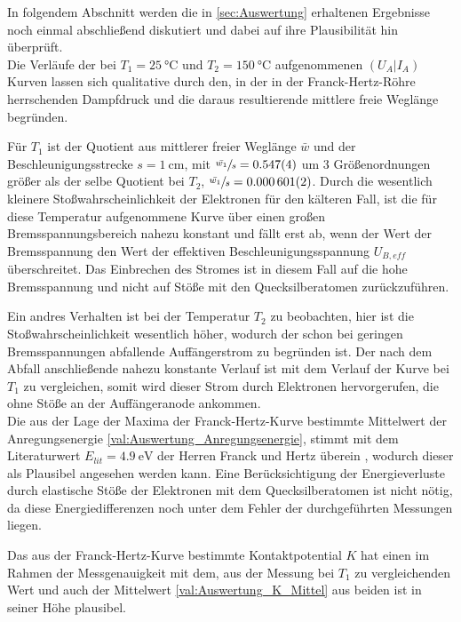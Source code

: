 In folgendem Abschnitt werden die in \cref{sec:Auswertung} erhaltenen 
Ergebnisse noch einmal abschließend diskutiert und dabei auf ihre Plausibilität
hin überprüft. \\

Die Verläufe der bei $T_{1} = \SI{25}{\celsius}$ und $T_{2} = \SI{150}{\celsius}$ aufgenommenen 
$(U_{A}|I_{A})$ Kurven lassen sich qualitative durch den, in der in der 
Franck-Hertz-Röhre herrschenden Dampfdruck und die daraus resultierende mittlere freie 
Weglänge begründen.

Für $T_{1}$ ist der Quotient aus mittlerer freier Weglänge $\bar{w}$ und der Beschleunigungsstrecke
$s = \SI{1}{\cm}$, mit $\sfrac{\bar{w_{1}}}{s} = \num{0.547(4)}$ um 3 Größenordnungen größer
als der selbe Quotient bei $T_{2}$, $\sfrac{\bar{w_{1}}}{s} =  \num{0.000601(2)}$.
Durch die wesentlich kleinere Stoßwahrscheinlichkeit der Elektronen für den kälteren Fall,
ist die für diese Temperatur aufgenommene Kurve über einen großen Bremsspannungsbereich 
nahezu konstant und fällt erst ab, wenn der Wert der Bremsspannung den Wert der effektiven
Beschleunigungsspannung $U_{B,eff}$ überschreitet. Das Einbrechen des Stromes ist
in diesem Fall auf die hohe Bremsspannung und nicht auf Stöße mit den Quecksilberatomen 
zurückzuführen.

Ein andres Verhalten ist bei der Temperatur $T_{2}$ zu beobachten, hier ist die Stoßwahrscheinlichkeit
wesentlich höher, wodurch der schon bei geringen Bremsspannungen abfallende Auffängerstrom zu begründen ist.
Der nach dem Abfall anschließende nahezu konstante Verlauf ist mit dem Verlauf der Kurve bei $T_{1}$ 
zu vergleichen, somit wird dieser Strom durch Elektronen hervorgerufen, die ohne Stöße an der Auffängeranode
ankommen.\\

Die aus der Lage der Maxima der Franck-Hertz-Kurve bestimmte Mittelwert der Anregungsenergie 
\cref{val:Auswertung_Anregungsenergie}, 
 stimmt mit dem Literaturwert $E_{lit} = \SI{4.9}{\eV}$ der Herren Franck und Hertz 
 überein \cite{FranckHertz14}, wodurch dieser
als Plausibel angesehen werden kann. Eine Berücksichtigung der Energieverluste durch elastische Stöße
der Elektronen mit dem Quecksilberatomen ist nicht nötig, da diese Energiedifferenzen noch unter dem 
Fehler der durchgeführten Messungen liegen.   

Das aus der Franck-Hertz-Kurve bestimmte Kontaktpotential $K$ hat einen im Rahmen der Messgenauigkeit 
mit dem, aus der Messung bei $T_{1}$ zu vergleichenden Wert und auch der Mittelwert \cref{val:Auswertung_K_Mittel} aus 
beiden ist in seiner Höhe plausibel.\\
 
